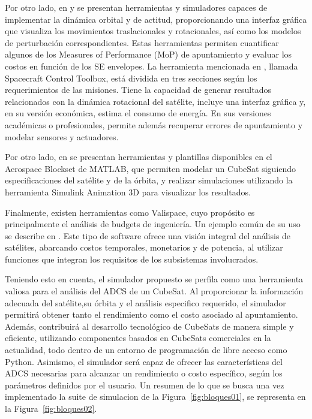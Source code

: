 Por otro lado, en \cite{ref18} y \cite{ref19} se presentan herramientas y simuladores capaces de implementar la dinámica orbital y de actitud, proporcionando una interfaz gráfica que visualiza los movimientos traslacionales y rotacionales, así como los modelos de perturbación correspondientes. Estas herramientas permiten cuantificar algunos de los Measures of Performance (MoP) de apuntamiento y evaluar los costos en función de los SE envelopes. La herramienta mencionada en \cite{ref18}, llamada Spacecraft Control Toolbox, está dividida en tres secciones según los requerimientos de las misiones. Tiene la capacidad de generar resultados relacionados con la dinámica rotacional del satélite, incluye una interfaz gráfica y, en su versión económica, estima el consumo de energía. En sus versiones académicas o profesionales, permite además recuperar errores de apuntamiento y modelar sensores y actuadores.

Por otro lado, en \cite{ref19} se presentan herramientas y plantillas disponibles en el Aerospace Blockset de MATLAB, que permiten modelar un CubeSat siguiendo especificaciones del satélite y de la órbita, y realizar simulaciones utilizando la herramienta Simulink Animation 3D para visualizar los resultados.

Finalmente, existen herramientas como Valispace, cuyo propósito es principalmente el análisis de budgets de ingeniería. Un ejemplo común de su uso se describe en \cite{ref20}. Este tipo de software ofrece una visión integral del análisis de satélites, abarcando costos temporales, monetarios y de potencia, al utilizar funciones que integran los requisitos de los subsistemas involucrados.


Teniendo esto en cuenta, el simulador propuesto se perfila como una herramienta valiosa para el análisis del ADCS de un CubeSat. Al proporcionar la información adecuada del satélite,su órbita y el análisis especifico requerido, el simulador permitirá obtener tanto el rendimiento como el costo asociado al apuntamiento. Además, contribuirá al desarrollo tecnológico de CubeSats de manera simple y eficiente, utilizando componentes basados en CubeSats comerciales en la actualidad, todo dentro de un entorno de programación de libre acceso como Python. Asimismo, el simulador será capaz de ofrecer las características del ADCS necesarias para alcanzar un rendimiento o costo específico, según los parámetros definidos por el usuario. Un resumen de lo que se busca una vez implementado la suite de simulacion de la Figura~\ref{fig:bloques01}, se representa en la Figura~\ref{fig:bloques02}.

